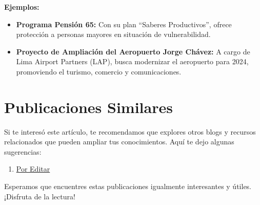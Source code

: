 \documentclass[
  jou,
  floatsintext,
  longtable,
  a4paper,
  nolmodern,
  notxfonts,
  notimes,
  colorlinks=true,linkcolor=blue,citecolor=blue,urlcolor=blue]{apa7}
\providecommand{\tightlist}{%
  \setlength{\itemsep}{0pt}\setlength{\parskip}{0pt}}
\begin{document}
\textbf{Ejemplos:}

\begin{itemize}
\tightlist
\item
  \textbf{Programa Pensión 65:} Con su plan ``Saberes Productivos'',
  ofrece protección a personas mayores en situación de vulnerabilidad.
\item
  \textbf{Proyecto de Ampliación del Aeropuerto Jorge Chávez:} A cargo
  de Lima Airport Partners (LAP), busca modernizar el aeropuerto para
  2024, promoviendo el turismo, comercio y comunicaciones.
\end{itemize}

\section{Publicaciones Similares}\label{publicaciones-similares}

Si te interesó este artículo, te recomendamos que explores otros blogs y
recursos relacionados que pueden ampliar tus conocimientos. Aquí te dejo
algunas sugerencias:

\begin{enumerate}
\def\labelenumi{\arabic{enumi}.}
\tightlist
\item
  \href{https://achalmaedison.netlify.app/gestion-publica-herramientas/posts/2024-03-31-por-editar/index.pdf}{}
  \href{https://achalmaedison.netlify.app/gestion-publica-herramientas/posts/2024-03-31-por-editar}{Por
  Editar}
\end{enumerate}

Esperamos que encuentres estas publicaciones igualmente interesantes y
útiles. ¡Disfruta de la lectura!
\end{document}
